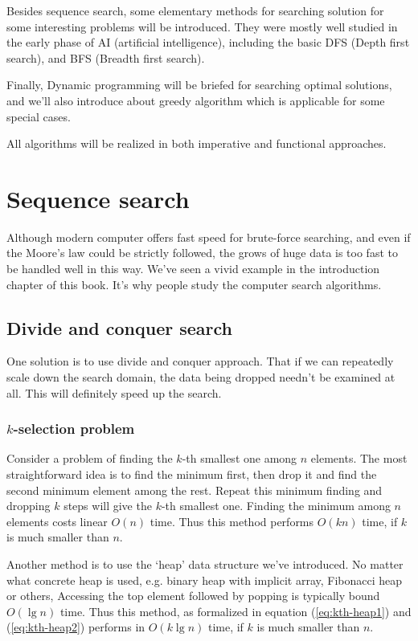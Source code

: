 \documentclass[UTF8]{article}
\begin{document}
Besides sequence search, some elementary methods for searching
solution for some interesting problems will be introduced. They
were mostly well studied in the early phase of AI (artificial
intelligence), including the basic DFS (Depth first search),
and BFS (Breadth first search).

Finally, Dynamic programming will be briefed for searching
optimal solutions, and we'll also introduce about greedy
algorithm which is applicable for some special cases.

All algorithms will be realized in both imperative and functional
approaches.

\section{Sequence search}
Although modern computer offers fast speed for brute-force searching,
and even if the Moore's law could be strictly followed, the grows of
huge data is too fast to be handled well in this way. We've seen
a vivid example in the introduction chapter of this book.
It's why people study the computer search algorithms.

\subsection{Divide and conquer search}
One solution is to use divide and conquer approach. That if we can
repeatedly scale down the search domain, the data being dropped needn't
be examined at all. This will definitely speed up the search.

\subsubsection{$k$-selection problem}
Consider a problem of finding the $k$-th smallest one among $n$ elements.
The most straightforward idea is to find the minimum first, then
drop it and find the second minimum element among the rest. Repeat
this minimum finding and dropping $k$ steps will give the
$k$-th smallest one. Finding the minimum among $n$ elements
costs linear $O(n)$ time. Thus this method performs $O(kn)$ time,
if $k$ is much smaller than $n$.

Another method is to use the `heap' data structure we've introduced.
No matter what concrete heap is used, e.g. binary heap with implicit array,
Fibonacci heap or others, Accessing the top element followed by
popping is typically bound $O(\lg n)$ time. Thus this method, as
formalized in equation (\ref{eq:kth-heap1}) and (\ref{eq:kth-heap2}) performs in $O(k \lg n)$ time, if
$k$ is much smaller than $n$.
\end{document}
